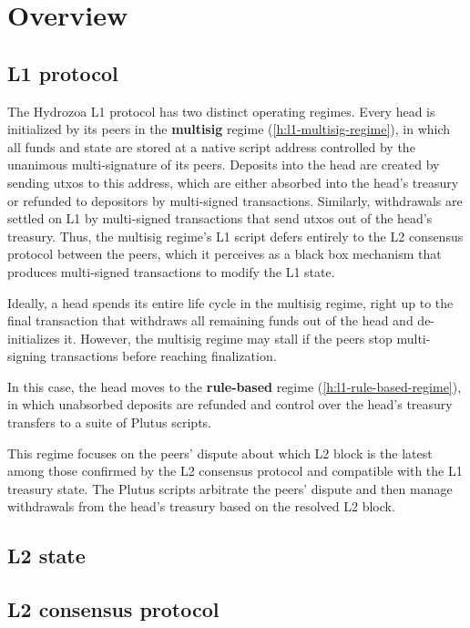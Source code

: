 \documentclass[../hydrozoa.tex]{subfiles}
\begin{document}
\chapter*{Overview}%
\label{h:overview-introduction}%
%


\section*{L1 protocol}%
\label{h:overview-l1-protocol}%
%

The Hydrozoa L1 protocol has two distinct operating regimes.
Every head is initialized by its peers in the \textbf{multisig} regime (\cref{h:l1-multisig-regime}), in which all funds and state are stored at a native script address controlled by the unanimous multi-signature of its peers.
Deposits into the head are created by sending utxos to this address, which are either absorbed into the head's treasury or refunded to depositors by multi-signed transactions.
Similarly, withdrawals are settled on L1 by multi-signed transactions that send utxos out of the head's treasury.
Thus, the multisig regime's L1 script defers entirely to the L2 consensus protocol between the peers, which it perceives as a black box mechanism that produces multi-signed transactions to modify the L1 state.

Ideally, a head spends its entire life cycle in the multisig regime, right up to the final transaction that withdraws all remaining funds out of the head and de-initializes it.
However, the multisig regime may stall if the peers stop multi-signing transactions before reaching finalization.

In this case, the head moves to the \textbf{rule-based} regime (\cref{h:l1-rule-based-regime}), in which unabsorbed deposits are refunded and control over the head's treasury transfers to a suite of Plutus scripts.

This regime focuses on the peers' dispute about which L2 block is the latest among those confirmed by the L2 consensus protocol and compatible with the L1 treasury state.
The Plutus scripts arbitrate the peers' dispute and then manage withdrawals from the head's treasury based on the resolved L2 block.


\section*{L2 state}%
\label{h:overview-l2-state}%
%


\section*{L2 consensus protocol}%
\label{h:overview-l2-consensus-protocol}%
%

\end{document}
